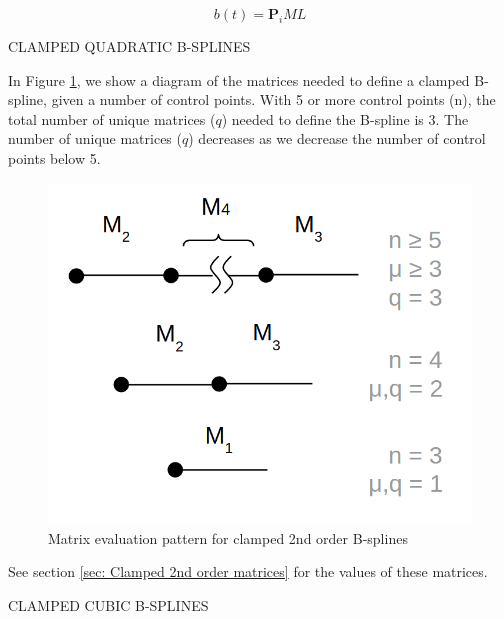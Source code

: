 \documentclass{article}
\begin{document}
    \begin{equation}
        b(t) = \textbf{P}_i M L
    \end{equation}

\hspace{1cm}
\noindent CLAMPED QUADRATIC B-SPLINES
\hfill \break

    In Figure \ref{Fig:Clamped 2nd Order}, we show a diagram of the matrices needed to define a clamped B-spline, given a number of control points. With 5 or more control points (n), the total number of unique matrices (\(q\)) needed to define the B-spline is 3. The number of unique matrices (\(q\)) decreases as we decrease the number of control points below 5.
    
\begin{figure}[H]
\begin{center}
\includegraphics[scale=.22]{Clamped2ndOrderMatrixPattern.png}
\end{center}
\caption{Matrix evaluation pattern for clamped 2nd order B-splines}
\label{Fig:Clamped 2nd Order}
\end{figure}

See section \ref{sec: Clamped 2nd order matrices} for the values of these matrices.

\hspace{1cm}

\noindent CLAMPED CUBIC B-SPLINES
\hfill \break
\end{document}
